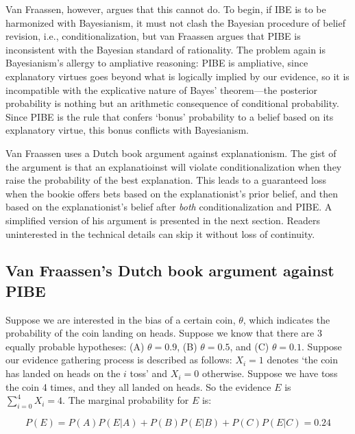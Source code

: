 Van Fraassen, however, argues that this cannot do. To begin, if IBE is
to be harmonized with Bayesianism, it must not clash the Bayesian
procedure of belief revision, i.e., conditionalization, but van Fraassen
argues that PIBE is inconsistent with the Bayesian standard
of rationality. The problem again is Bayesianism's allergy to ampliative
reasoning: PIBE is ampliative, since explanatory virtues goes beyond
what is logically implied by our evidence, so it is incompatible with
the explicative nature of Bayes' theorem---the posterior
probability is nothing but an arithmetic consequence of conditional
probability. Since PIBE is the rule that confers
`bonus' probability to a belief based on its explanatory virtue, this bonus  conflicts with Bayesianism.

Van Fraassen uses a Dutch book argument against explanationism. The gist
of the argument is that an explanatioinst will violate
conditionalization when they raise the probability of the best
explanation. This leads to a guaranteed loss when the bookie offers bets
based on the explanationist's prior belief, and then based on the
explanationist's belief after \emph{both} conditionalization and PIBE. A
simplified version of his argument is presented in the next section.
Readers uninterested in the technical details can skip it without loss
of continuity.

\hypertarget{van-fraassens-dutch-book-argument-against-pibe}{%
\subsection{Van Fraassen's Dutch book argument against
PIBE}\label{van-fraassens-dutch-book-argument-against-pibe}}

Suppose we are interested in the bias of a certain coin, \(\theta\),
which indicates the probability of the coin landing on heads. Suppose we
know that there are 3 equally probable hypotheses: (A) \(\theta = 0.9\),
(B) \(\theta = 0.5\), and (C) \(\theta = 0.1\). Suppose our evidence
gathering process is described as follows: \(X_i = 1\) denotes `the coin
has landed on heads on the \(i\) toss' and \(X_i = 0\) otherwise.
Suppose we have toss the coin 4 times, and they all landed on heads. So
the evidence \(E\) is \(\sum_{i=0}^4 X_i = 4\). The marginal probability
for \(E\) is:

\[P(E) = P(A)P(E|A)+P(B)P(E|B)+P(C)P(E|C) = 0.24\]

